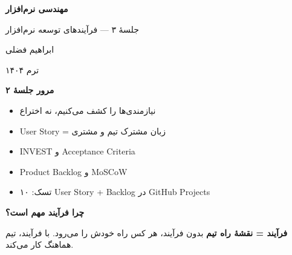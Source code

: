 \documentclass[14pt, a4paper, landscape]{extarticle}
\newcommand{\slide}[1]{%
    \newpage
    \begin{center}
    \begin{minipage}[t]{0.95\textwidth}
    \vspace{0.5cm}
    #1
    \vspace{0.5cm}
    \end{minipage}
    \end{center}
}
\newcommand{\slidetitle}[1]{%
    \begin{center}
        {\LARGE\bfseries\textcolor{primary}{#1}}
    \end{center}
    \vspace{0.5cm}
}
\newcommand{\myaccent}[1]{\textcolor{accent}{#1}}
\begin{document}
\pagestyle{empty}


\begin{center}
    \vspace*{4cm}
    {\color{white}\Huge\bfseries مهندسی نرم‌افزار}
    
    \vspace{1cm}
    
    {\color{accent}\LARGE جلسهٔ ۳ — فرآیندهای توسعه نرم‌افزار}
    
    \vspace{2cm}
    
    {\color{white}\Large ابراهیم فضلی}
    
    \vspace{0.5cm}
    
    {\color{white}\large ترم ۱۴۰۴}
\end{center}

\pagestyle{fancy}


\slide{
    \slidetitle{مرور جلسهٔ ۲}
    \vspace{0.5cm}
    \begin{itemize}[itemsep=0.6em]
        \item نیازمندی‌ها را کشف می‌کنیم، نه اختراع
        \item User Story = زبان مشترک تیم و مشتری
        \item INVEST و Acceptance Criteria
        \item Product Backlog و MoSCoW
        \item تسک: ۱۰ User Story + Backlog در GitHub Projects
    \end{itemize}
}

\slide{
    \slidetitle{چرا فرآیند مهم است؟}
    \vspace{1cm}
    \begin{center}
        {\Large\bfseries\myaccent{فرآیند = نقشهٔ راه تیم}}
        \vspace{1.5cm}
        {\large بدون فرآیند، هر کس راه خودش را می‌رود.}
        \vspace{0.5cm}
        {\large با فرآیند، تیم هماهنگ کار می‌کند.}
    \end{center}
}
\end{document}
